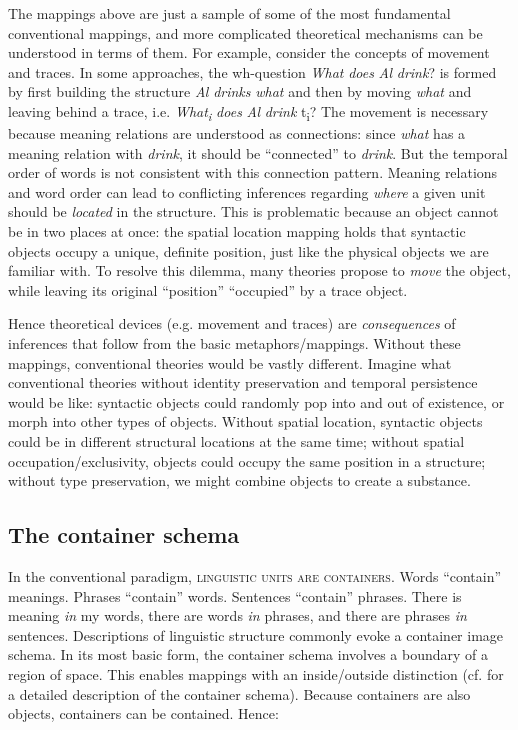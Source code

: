   The mappings above are just a sample of some of the most fundamental conventional mappings, and more complicated theoretical mechanisms can be understood in terms of them. For example, consider the concepts of movement and traces. In some approaches, the wh-question \textit{What} \textit{does} \textit{Al} \textit{drink}? is formed by first building the structure \textit{Al} \textit{drinks} \textit{what} and then by moving \textit{what} and leaving behind a trace, i.e. \textit{What\textsubscript{i}} \textit{does} \textit{Al} \textit{drink} t\textsubscript{i}? The movement is necessary because meaning relations are understood as connections: since \textit{what} has a meaning relation with \textit{drink}, it should be “connected” to \textit{drink}. But the temporal order of words is not consistent with this connection pattern. Meaning relations and word order can lead to conflicting inferences regarding \textit{where} a given unit should be \textit{located} in the structure. This is problematic because an object cannot be in two places at once: the spatial location mapping holds that syntactic objects occupy a unique, definite position, just like the physical objects we are familiar with. To resolve this dilemma, many theories propose to \textit{move} the object, while leaving its original “position” “occupied” by a trace object.

  Hence theoretical devices (e.g. movement and traces) are \textit{consequences} of inferences that follow from the basic metaphors/mappings. Without these mappings, conventional theories would be vastly different. Imagine what conventional theories without identity preservation and temporal persistence would be like: syntactic objects could randomly pop into and out of existence, or morph into other types of objects. Without spatial location, syntactic objects could be in different structural locations at the same time; without spatial occupation/exclusivity, objects could occupy the same position in a structure; without type preservation, we might combine objects to create a substance.

\subsection{The container schema} 

In the conventional paradigm, \textsc{linguistic} \textsc{units} \textsc{are} \textsc{containers}. Words “contain” meanings. Phrases “contain” words. Sentences “contain” phrases. There is meaning \textit{in} my words, there are words \textit{in} phrases, and there are phrases \textit{in} sentences. Descriptions of linguistic structure commonly evoke a container image schema. In its most basic form, the container schema involves a boundary of a region of space. This enables mappings with an inside/outside distinction (cf. \citet{LakoffNúñez2000} for a detailed description of the container schema). Because containers are also objects, containers can be contained. Hence:

